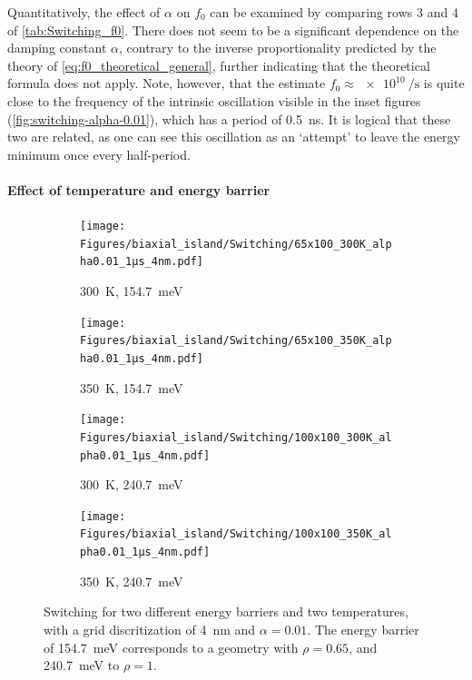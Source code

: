 \documentclass[11pt,a4paper,english]{article}
\begin{document}
Quantitatively, the effect of $\alpha$ on $f_0$ can be examined by comparing rows 3 and 4 of \cref{tab:Switching_f0}. There does not seem to be a significant dependence on the damping constant $\alpha$, contrary to the inverse proportionality predicted by the theory of \cref{eq:f0_theoretical_general}, further indicating that the theoretical formula does not apply. Note, however, that the estimate $f_0\approx\SI{e10}{\per\second}$ is quite close to the frequency of the intrinsic oscillation visible in the inset figures (\cref{fig:switching-alpha-0.01}), which has a period of \SI{0.5}{\nano\second}. It is logical that these two are related, as one can see this oscillation as an `attempt' to leave the energy minimum once every half-period.

\paragraph{Effect of temperature and energy barrier}
\begin{figure}
     \centering
     \begin{subfigure}[b]{0.49\textwidth}
         \centering
         \texttt{[image: Figures/biaxial\_island/Switching/65x100\_300K\_alpha0.01\_1µs\_4nm.pdf]}
         \caption{\SI{300}{\kelvin}, \SI{154.7}{\milli\electronvolt}}
         \label{fig:switching-temp-300-65x100}
     \end{subfigure}
     \hfill
     \begin{subfigure}[b]{0.49\textwidth}
         \centering
         \texttt{[image: Figures/biaxial\_island/Switching/65x100\_350K\_alpha0.01\_1µs\_4nm.pdf]}
         \caption{\SI{350}{\kelvin}, \SI{154.7}{\milli\electronvolt}}
         \label{fig:switching-temp-350-65x100}
     \end{subfigure}
     \begin{subfigure}[b]{0.49\textwidth}
         \centering
         \texttt{[image: Figures/biaxial\_island/Switching/100x100\_300K\_alpha0.01\_1µs\_4nm.pdf]}
         \caption{\SI{300}{\kelvin}, \SI{240.7}{\milli\electronvolt}}
         \label{fig:switching-temp-300-100x100}
     \end{subfigure}
     \hfill
     \begin{subfigure}[b]{0.49\textwidth}
         \centering
         \texttt{[image: Figures/biaxial\_island/Switching/100x100\_350K\_alpha0.01\_1µs\_4nm.pdf]}
         \caption{\SI{350}{\kelvin}, \SI{240.7}{\milli\electronvolt}}
         \label{fig:switching-temp-350-100x100}
     \end{subfigure}
    \caption{Switching for two different energy barriers and two temperatures, with a grid discritization of \SI{4}{\nano\metre} and $\alpha = 0.01$. The energy barrier of \SI{154.7}{\milli\electronvolt} corresponds to a geometry with $\rho=0.65$, and \SI{240.7}{\milli\electronvolt} to $\rho=1$.}
    \label{fig:switching-temp}
\end{figure}
\end{document}
